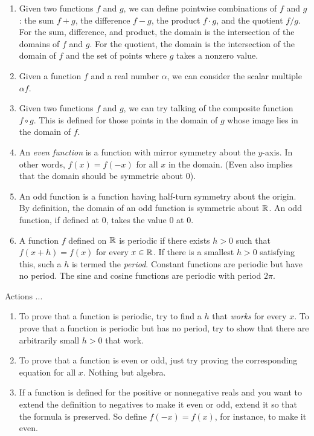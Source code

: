 \documentclass[10pt]{amsart}
\begin{document}
\begin{enumerate}
\item Given two functions $f$ and $g$, we can define pointwise
  combinations of $f$ and $g$: the sum $f + g$, the difference $f -
  g$, the product $f \cdot g$, and the quotient $f/g$. For the sum,
  difference, and product, the domain is the intersection of the
  domains of $f$ and $g$. For the quotient, the domain is the
  intersection of the domain of $f$ and the set of points where $g$
  takes a nonzero value.
\item Given a function $f$ and a real number $\alpha$, we can consider
  the scalar multiple $\alpha f$.
\item Given two functions $f$ and $g$, we can try talking of the
  composite function $f \circ g$. This is defined for those points in
  the domain of $g$ whose image lies in the domain of $f$.
\item An {\em even function} is a function with mirror symmetry about
  the $y$-axis. In other words, $f(x) = f(-x)$ for all $x$ in the
  domain. (Even also implies that the domain should be symmetric about $0$).
\item An odd function is a function having half-turn symmetry about
  the origin. By definition, the domain of an odd function is
  symmetric about $\mathbb{R}$. An odd function, if defined at $0$, takes the
  value $0$ at $0$.
\item A function $f$ defined on $\mathbb{R}$ is periodic if there exists $h >
  0$ such that $f(x+ h) = f(x)$ for every $x \in \mathbb{R}$. If there is a
  smallest $h > 0$ satisfying this, such a $h$ is termed the {\em
  period}. Constant functions are periodic but have no period. The
  sine and cosine functions are periodic with period $2\pi$.
\end{enumerate}

Actions ...

\begin{enumerate}
\item To prove that a function is periodic, try to find a $h$ that
  {\em works} for every $x$. To prove that a function is periodic but
  has no period, try to show that there are arbitrarily small $h > 0$
  that work.
\item To prove that a function is even or odd, just try proving the
  corresponding equation for all $x$. Nothing but algebra.
\item If a function is defined for the positive or nonnegative reals
  and you want to extend the definition to negatives to make it even
  or odd, extend it so that the formula is preserved. So define $f(-x)
  = f(x)$, for instance, to make it even.
\end{enumerate}
\end{document}
